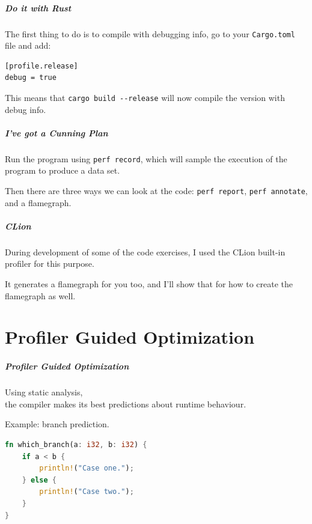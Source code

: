 \begin{frame}[fragile]
\frametitle{Do it with Rust}

The first thing to do is to compile with debugging info, go to your \texttt{Cargo.toml} file and add:
\begin{verbatim}
[profile.release]
debug = true
\end{verbatim}

This means that \verb+cargo build --release+ will now compile the version with debug info.

\end{frame}

\begin{frame}
\frametitle{I've got a Cunning Plan}

Run the program using \texttt{perf record}, which will sample the execution of the program to produce a data set.


Then there are three ways we can look at the code: \texttt{perf report}, \texttt{perf annotate}, and a flamegraph.

\end{frame}


\begin{frame}
\frametitle{CLion}

During development of some of the code exercises, I used the CLion built-in profiler for this purpose. 

It generates a flamegraph for you too, and I'll show that for how to create the flamegraph as well.


\end{frame}

\part{Profiler Guided Optimization}
\begin{frame}
\partpage
\end{frame}

\begin{frame}[fragile]
\frametitle{Profiler Guided Optimization}


Using static analysis, \\
the compiler makes its best predictions about runtime behaviour.

Example: branch prediction. 

\begin{lstlisting}[language=Rust]
fn which_branch(a: i32, b: i32) {
    if a < b {
        println!("Case one.");
    } else {
        println!("Case two.");
    }
}
\end{lstlisting}

\end{frame}

